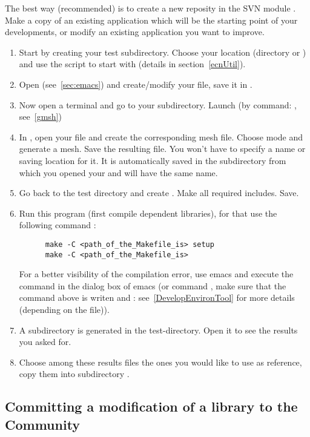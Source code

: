 The best way (recommended) is to create a new reposity in the SVN
module . Make a copy of an existing application which
will be the starting point of your developments, or modify an
existing application you want to improve.



\begin{enumerate}
\item Start by creating your test subdirectory. Choose your location (directory  or 		) and use
	the script  to start with (details in
	section~\ref{ecnUtil}).
\item Open  (see~\ref{sec:emacs}) and create/modify your  file, save it in 		.
\item Now open a terminal and go to your  subdirectory. Launch    (by command: 		, see~\ref{gmsh})
\item In , open your  file and create the corresponding mesh file. Choose  	mode and generate a  mesh. Save the resulting file. You won't have to specify a name or 	saving location for it. It is automatically saved in the subdirectory from which you opened your 	 and will have the same name.
\item Go back to the test directory and create . Make all required includes. Save.
\item Run this program (first compile dependent libraries), for that use the following command :
\begin{verbatim}
      make -C <path_of_the_Makefile_is> setup
      make -C <path_of_the_Makefile_is> 
\end{verbatim}
For a better visibility of the compilation error, use emacs and execute the command in the dialog box of emacs (or command , make sure that the command above is writen and  : see~\ref{DevelopEnvironTool} for more details (depending on the  file)). 
\item  A subdirectory  is generated in the  test-directory. Open it to see the results you asked for.
\item Choose among these results files the ones you would like to use as reference, copy them into subdirectory .
\end{enumerate}




\subsection{Committing a modification of a library  to the Community}\label{common_commit}

